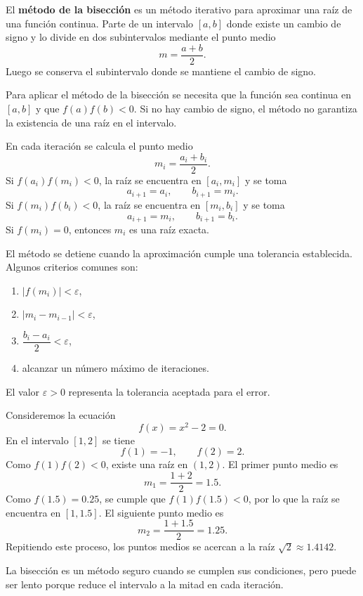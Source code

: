 \documentclass[a4,11pt]{aleph-notas}
\begin{document}
\begin{defi}
    El \textbf{método de la bisección} es un método iterativo para aproximar una raíz de una función continua. Parte de un intervalo $[a,b]$ donde existe un cambio de signo y lo divide en dos subintervalos mediante el punto medio
    \[
        m = \frac{a+b}{2}.
    \]
    Luego se conserva el subintervalo donde se mantiene el cambio de signo.
\end{defi}

\begin{advertencia}
    Para aplicar el método de la bisección se necesita que la función sea continua en $[a,b]$ y que $f(a)f(b)<0$. Si no hay cambio de signo, el método no garantiza la existencia de una raíz en el intervalo.
\end{advertencia}

\begin{defi}
    En cada iteración se calcula el punto medio
    \[
        m_i = \frac{a_i+b_i}{2}.
    \]
    Si $f(a_i)f(m_i)<0$, la raíz se encuentra en $[a_i,m_i]$ y se toma
    \[
        a_{i+1}=a_i, \qquad b_{i+1}=m_i.
    \]
    Si $f(m_i)f(b_i)<0$, la raíz se encuentra en $[m_i,b_i]$ y se toma
    \[
        a_{i+1}=m_i, \qquad b_{i+1}=b_i.
    \]
    Si $f(m_i)=0$, entonces $m_i$ es una raíz exacta.
\end{defi}

\begin{defi}
    El método se detiene cuando la aproximación cumple una tolerancia establecida. Algunos criterios comunes son:
    \begin{enumerate}
        \item $|f(m_i)|<\varepsilon$,
        \item $|m_i-m_{i-1}|<\varepsilon$,
        \item $\dfrac{b_i-a_i}{2}<\varepsilon$,
        \item alcanzar un número máximo de iteraciones.
    \end{enumerate}
    El valor $\varepsilon>0$ representa la tolerancia aceptada para el error.
\end{defi}

\begin{ejem}
    Consideremos la ecuación
    \[
        f(x)=x^2-2=0.
    \]
    En el intervalo $[1,2]$ se tiene
    \[
        f(1)=-1, \qquad f(2)=2.
    \]
    Como $f(1)f(2)<0$, existe una raíz en $(1,2)$. El primer punto medio es
    \[
        m_1=\frac{1+2}{2}=1.5.
    \]
    Como $f(1.5)=0.25$, se cumple que $f(1)f(1.5)<0$, por lo que la raíz se encuentra en $[1,1.5]$. El siguiente punto medio es
    \[
        m_2=\frac{1+1.5}{2}=1.25.
    \]
    Repitiendo este proceso, los puntos medios se acercan a la raíz $\sqrt{2}\approx 1.4142$.
\end{ejem}

\begin{advertencia}
    La bisección es un método seguro cuando se cumplen sus condiciones, pero puede ser lento porque reduce el intervalo a la mitad en cada iteración.
\end{advertencia}
\end{document}
